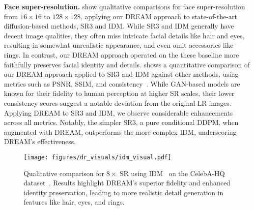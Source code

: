 \textbf{Face super-resolution.}
 show qualitative comparisons for face super-resolution from $16\times16$ to $128\times128$, applying our DREAM approach to state-of-the-art diffusion-based methods, SR3 and IDM. While SR3 and IDM generally have decent image qualities, they often miss intricate facial details like hair and eyes, resulting in somewhat unrealistic appearance, and even omit accessories like rings. In contrast, our DREAM approach operated on the these baseline  more faithfully preserves facial identity and details.  shows a quantitative comparison of our DREAM approach applied to SR3 and IDM against other methods, using metrics such as PSNR, SSIM, and consistency~\cite{saharia2022image}. While GAN-based models are known for their fidelity to human perception at higher SR scales, their lower consistency scores suggest a notable deviation from the original LR images. Applying DREAM to SR3 and IDM, we observe considerable enhancements across all metrics. Notably, the simpler SR3, a pure conditional DDPM, when augmented with DREAM, outperforms the more complex IDM, underscoring DREAM's effectiveness.

\begin{figure}[t]
    \centering
    \texttt{[image: figures/dr\_visuals/idm\_visual.pdf]}
    \vspace{-.1in}
    \caption{
    Qualitative comparison for $8\times$ SR using IDM~\cite{gao2023implicit} on the CelebA-HQ dataset~\cite{karras2017progressive}. Results highlight DREAM's superior fidelity and enhanced identity preservation, leading to more realistic detail generation in features like hair, eyes, and rings.} 
        \label{fig:face-idm}
    \vspace{-.1in}
\end{figure}



